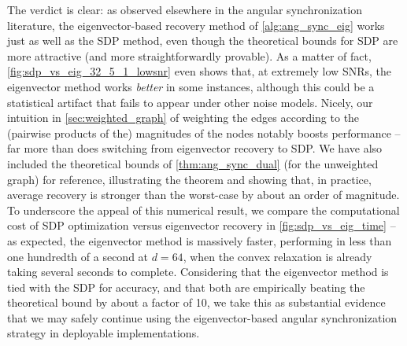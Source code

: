 The verdict is clear: as observed elsewhere in the angular synchronization literature, the eigenvector-based recovery method of \cref{alg:ang_sync_eig} works just as well as the SDP method, even though the theoretical bounds for SDP are more attractive (and more straightforwardly provable).  As a matter of fact, \cref{fig:sdp_vs_eig_32_5_1_lowsnr} even shows that, at extremely low SNRs, the eigenvector method works \emph{better} in some instances, although this could be a statistical artifact that fails to appear under other noise models.  Nicely, our intuition in \cref{sec:weighted_graph} of weighting the edges according to the (pairwise products of the) magnitudes of the nodes notably boosts performance -- far more than does switching from eigenvector recovery to SDP.  We have also included the theoretical bounds of \cref{thm:ang_sync_dual} (for the unweighted graph) for reference, illustrating the theorem and showing that, in practice, average recovery is stronger than the worst-case by about an order of magnitude.  To underscore the appeal of this numerical result, we compare the computational cost of SDP optimization versus eigenvector recovery in \cref{fig:sdp_vs_eig_time} -- as expected, the eigenvector method is massively faster, performing in less than one hundredth of a second at $d = 64$, when the convex relaxation is already taking several seconds to complete.  Considering that the eigenvector method is tied with the SDP for accuracy, and that both are empirically beating the theoretical bound by about a factor of 10, we take this as substantial evidence that we may safely continue using the eigenvector-based angular synchronization strategy in deployable implementations.

